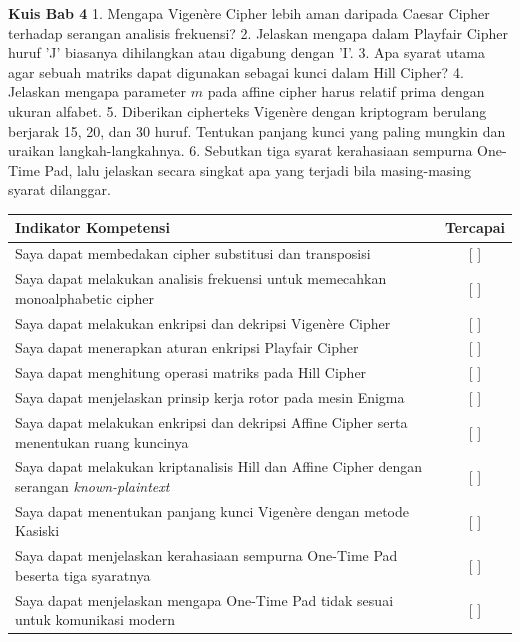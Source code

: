 
\begin{obeassessment}
\textbf{Kuis Bab 4}
1. Mengapa Vigen\`ere Cipher lebih aman daripada Caesar Cipher terhadap serangan analisis frekuensi?
2. Jelaskan mengapa dalam Playfair Cipher huruf 'J' biasanya dihilangkan atau digabung dengan 'I'.
3. Apa syarat utama agar sebuah matriks dapat digunakan sebagai kunci dalam Hill Cipher?
4. Jelaskan mengapa parameter $m$ pada affine cipher harus relatif prima dengan ukuran alfabet.
5. Diberikan cipherteks Vigen\`ere dengan kriptogram berulang berjarak 15, 20, dan 30 huruf. Tentukan panjang kunci yang paling mungkin dan uraikan langkah-langkahnya.
6. Sebutkan tiga syarat kerahasiaan sempurna One-Time Pad, lalu jelaskan secara singkat apa yang terjadi bila masing-masing syarat dilanggar.
\end{obeassessment}
\begin{competencychecklist}
\begin{tabularx}{\linewidth}{|X|c|}
\hline
Indikator Kompetensi & Tercapai \\
\hline
Saya dapat membedakan cipher substitusi dan transposisi & [ ] \\
\hline
Saya dapat melakukan analisis frekuensi untuk memecahkan monoalphabetic cipher & [ ] \\
\hline
Saya dapat melakukan enkripsi dan dekripsi Vigen\`ere Cipher & [ ] \\
\hline
Saya dapat menerapkan aturan enkripsi Playfair Cipher & [ ] \\
\hline
Saya dapat menghitung operasi matriks pada Hill Cipher & [ ] \\
\hline
Saya dapat menjelaskan prinsip kerja rotor pada mesin Enigma & [ ] \\
\hline
Saya dapat melakukan enkripsi dan dekripsi Affine Cipher serta menentukan ruang kuncinya & [ ] \\
\hline
Saya dapat melakukan kriptanalisis Hill dan Affine Cipher dengan serangan \textit{known-plaintext} & [ ] \\
\hline
Saya dapat menentukan panjang kunci Vigen\`ere dengan metode Kasiski & [ ] \\
\hline
Saya dapat menjelaskan kerahasiaan sempurna One-Time Pad beserta tiga syaratnya & [ ] \\
\hline
Saya dapat menjelaskan mengapa One-Time Pad tidak sesuai untuk komunikasi modern & [ ] \\
\hline
\end{tabularx}
\end{competencychecklist}
